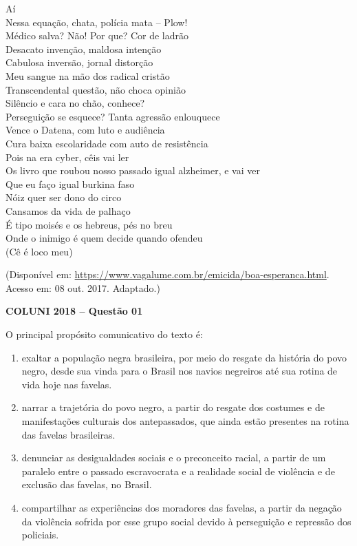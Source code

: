 \noindent
Aí\\
Nessa equação, chata, polícia mata -- Plow!\\
Médico salva? Não! Por que? Cor de ladrão\\
Desacato invenção, maldosa intenção\\
Cabulosa inversão, jornal distorção\\
Meu sangue na mão dos radical cristão\\
Transcendental questão, não choca opinião\\
Silêncio e cara no chão, conhece?\\
Perseguição se esquece? Tanta agressão enlouquece\\
Vence o Datena, com luto e audiência\\
Cura baixa escolaridade com auto de resistência\\
Pois na era cyber, cêis vai ler\\
Os livro que roubou nosso passado igual alzheimer, e vai ver\\
Que eu faço igual burkina faso\\
Nóiz quer ser dono do circo\\
Cansamos da vida de palhaço\\
É tipo moisés e os hebreus, pés no breu\\
Onde o inimigo é quem decide quando ofendeu\\
(Cê é loco meu)\\
[...]

\vspace{0.3cm}

\begin{center}
\footnotesize
(Disponível em: \url{https://www.vagalume.com.br/emicida/boa-esperanca.html}.
Acesso em: 08 out. 2017. Adaptado.)
\end{center}

\textbf{COLUNI 2018 -- Questão 01}\par\medskip O principal propósito comunicativo do texto é:

\begin{enumerate}
\item exaltar a população negra brasileira, por meio do resgate da história do povo negro, desde sua vinda para
      o Brasil nos navios negreiros até sua rotina de vida hoje nas favelas.
\item narrar a trajetória do povo negro, a partir do resgate dos costumes e de manifestações culturais dos
      antepassados, que ainda estão presentes na rotina das favelas brasileiras.
\item denunciar as desigualdades sociais e o preconceito racial, a partir de um paralelo entre o passado
      escravocrata e a realidade social de violência e de exclusão das favelas, no Brasil.
\item compartilhar as experiências dos moradores das favelas, a partir da negação da violência sofrida por
      esse grupo social devido à perseguição e repressão dos policiais.
\end{enumerate}
